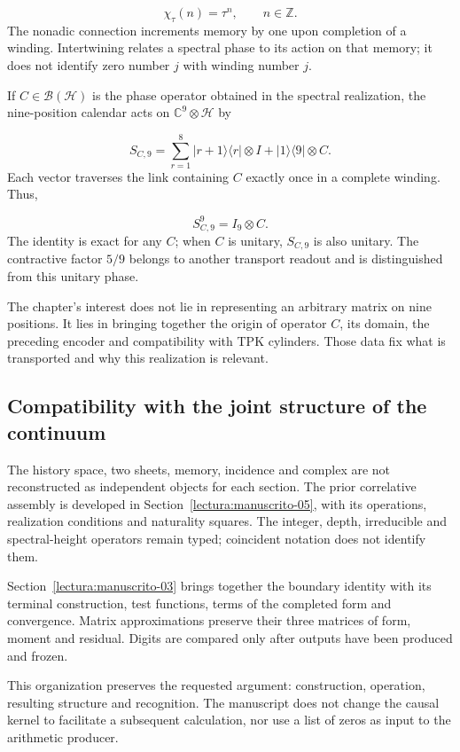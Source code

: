\[
\chi_\tau(n)=\tau^n,\qquad n\in\mathbb Z.
\]
The nonadic connection increments memory by one upon completion of a winding. Intertwining relates a spectral phase to its action on that memory; it does not identify zero number $j$ with winding number $j$.

If \(C\in\mathcal B(\mathcal H)\) is the phase operator obtained in the spectral realization, the nine-position calendar acts on \(\mathbb C^9\otimes\mathcal H\) by

\[
S_{C,9}=\sum_{r=1}^8|r+1\rangle\langle r|\otimes I
+|1\rangle\langle9|\otimes C.
\]
Each vector traverses the link containing $C$ exactly once in a complete winding. Thus,

\[
S_{C,9}^9=I_9\otimes C.
\]
The identity is exact for any $C$; when $C$ is unitary, $S_{C,9}$ is also unitary. The contractive factor $5/9$ belongs to another transport readout and is distinguished from this unitary phase.

The chapter's interest does not lie in representing an arbitrary matrix on nine positions. It lies in bringing together the origin of operator $C$, its domain, the preceding encoder and compatibility with TPK cylinders. Those data fix what is transported and why this realization is relevant.

\subsection{Compatibility with the joint structure of the continuum}
The history space, two sheets, memory, incidence and complex are not reconstructed as independent objects for each section. The prior correlative assembly is developed in Section~\ref{lectura:manuscrito-05}, with its operations, realization conditions and naturality squares. The integer, depth, irreducible and spectral-height operators remain typed; coincident notation does not identify them.

Section~\ref{lectura:manuscrito-03} brings together the boundary identity with its terminal construction, test functions, terms of the completed form and convergence. Matrix approximations preserve their three matrices of form, moment and residual. Digits are compared only after outputs have been produced and frozen.

This organization preserves the requested argument: construction, operation, resulting structure and recognition. The manuscript does not change the causal kernel to facilitate a subsequent calculation, nor use a list of zeros as input to the arithmetic producer.
